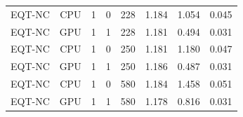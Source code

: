 \begin{landscape}
\begin{center}
\begin{tabular}{lccccccc}
EQT-NC         & CPU & 1 & 0 & 228 & 1.184 & 1.054 & 0.045 \\
EQT-NC         & GPU & 1 & 1 & 228 & 1.181 & 0.494 & 0.031 \\
EQT-NC         & CPU & 1 & 0 & 250 & 1.181 & 1.180 & 0.047 \\
EQT-NC         & GPU & 1 & 1 & 250 & 1.186 & 0.487 & 0.031 \\
EQT-NC         & CPU & 1 & 0 & 580 & 1.184 & 1.458 & 0.051 \\
EQT-NC         & GPU & 1 & 1 & 580 & 1.178 & 0.816 & 0.031 \\
\bottomrule
\end{tabular}
\end{center}

\end{landscape}

